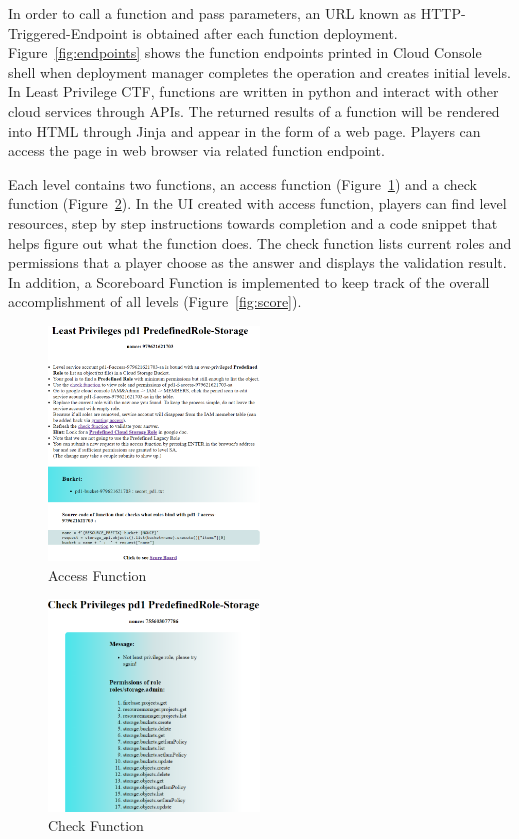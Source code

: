 \documentclass[a4paper,twoside]{article}
\begin{document}
In order to call a function and pass parameters, an URL known as HTTP-Triggered-Endpoint is obtained after each function deployment. Figure~\ref{fig:endpoints} shows the function endpoints printed in Cloud Console shell when deployment manager completes the operation and creates initial levels. In Least Privilege CTF, functions are written in python and interact with other cloud services through APIs. The returned results of a function will be rendered into HTML through Jinja and appear in the form of a web page. Players can access the page in web browser via related function endpoint.

Each level contains two functions, an access function (Figure~\ref{fig:access}) and a check function (Figure~\ref{fig:check}). In the UI created with access function, players can find level resources, step by step instructions towards completion and a code snippet that helps figure out what the function does. The check function lists current roles and permissions that a player choose as the answer and displays the validation result. In addition,  a Scoreboard Function is implemented to keep track of the overall accomplishment of all levels (Figure~\ref{fig:score}).  
\begin{figure}[!h]
  \centering
  \includegraphics[width=0.5\textwidth]{pic/access}
  \caption {Access Function}
  \label{fig:access}
\end{figure}
\begin{figure}[!h]
  \centering
  \includegraphics[width=0.5\textwidth]{pic/check}
  \caption {Check Function}
  \label{fig:check}
\end{figure}
\end{document}
